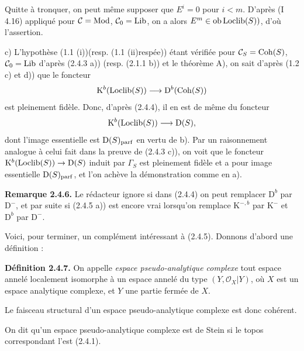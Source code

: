 Quitte à tronquer, on peut même supposer que $E^i=0$ pour $i<m$. D'après (I 4.16) appliqué pour $\mathcal C=\Mod$, $\mathcal C_0=\Lib$, on a alors $E^m\in\Ob\Loclib(S))$, d'où l'assertion.

c) L'hypothèse (1.1 (i))(resp. (1.1 (ii)respée)) étant vérifiée pour $\mathcal C_S=\Coh(S)$, $\mathcal C_0=\Lib$ d'après (2.4.3 a)) (resp. (2.1.1 b)) et le théorème A), on sait d'après (1.2 c) et d)) que le foncteur
\[
\mathrm K^b(\Loclib(S))\longrightarrow\mathrm D^b(\Coh(S))
\]
est pleinement fidèle. Donc, d'après (2.4.4), il en est de même du foncteur
\[
\mathrm K^b(\Loclib(S))\longrightarrow\mathrm D(S),
\]
dont l'image essentielle est $\mathrm D(S)_{\parf}$ en vertu de b). Par un raisonnement analogue à celui fait dans la preuve de (2.4.3 c)), on voit que le foncteur $\mathrm K^b(\Loclib(S))\to\mathrm D(S)$ induit par $\Gamma_S$ est pleinement fidèle et a pour image essentielle $\mathrm D(S)_{\parf}$, et l'on achève la démonstration comme en a).

\textbf{Remarque 2.4.6.} Le rédacteur ignore si dans (2.4.4) on peut remplacer $\mathrm D^b$ par $\mathrm D^{-}$, et par suite si (2.4.5 a)) est encore vrai lorsqu'on remplace $\mathrm K^{-,b}$ par $\mathrm K^{-}$ et $\mathrm D^b$ par $\mathrm D^{-}$.

Voici, pour terminer, un complément intéressant à (2.4.5). Donnons d'abord une définition :

\textbf{Définition 2.4.7.} On appelle \emph{espace pseudo-analytique complexe} tout espace annelé localement isomorphe à un espace annelé du type $(Y,\mathcal O_X|Y)$, où $X$ est un espace analytique complexe, et $Y$ une partie fermée de $X$.

Le faisceau structural d'un espace pseudo-analytique complexe est donc cohérent.

On dit qu'un espace pseudo-analytique complexe est de Stein si le topos correspondant l'est (2.4.1).



\providecommand{\Qcoh}{\operatorname{Qcoh}}
\providecommand{\Mod}{\operatorname{Mod}}
\providecommand{\Coh}{\operatorname{Coh}}
\renewcommand{\Ob}{\operatorname{ob}}
\providecommand{\Hom}{\operatorname{Hom}}
\providecommand{\Ext}{\operatorname{Ext}}
\providecommand{\Spec}{\operatorname{Spec}}
\providecommand{\qcoh}{\mathrm{qcoh}}
\providecommand{\parf}{\mathrm{parf}}
\providecommand{\coh}{\mathrm{coh}}
\providecommand{\Loclib}{\operatorname{Loclib}}
\providecommand{\Lib}{\operatorname{Lib}}
\providecommand{\im}{\operatorname{Im}}

